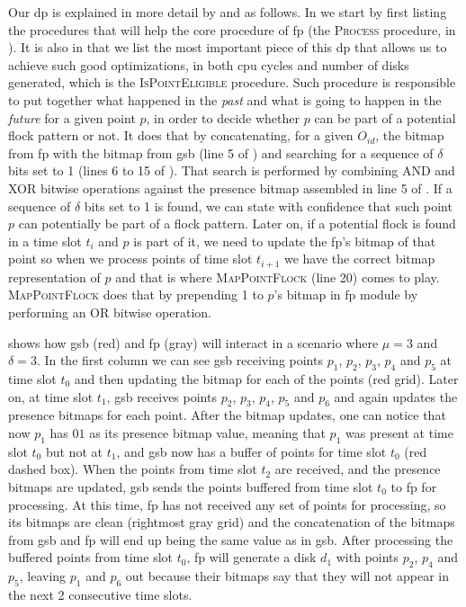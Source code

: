 Our \ac{dp} is explained in more detail by  and  as follows. In
 we start by first listing the procedures that will help the core procedure of \ac{fp} (the
\textsc{Process} procedure, in ). It is also in  that we list the most important
piece of this \ac{dp} that allows us to achieve such good optimizations, in both \ac{cpu} cycles and number of disks
generated, which is the \textsc{IsPointEligible} procedure. Such procedure is responsible to put together what happened
in the \textit{past} and what is going to happen in the \textit{future} for a given point $p$, in order to decide
whether $p$ can be part of a potential flock pattern or not. It does that by concatenating, for a given $O_{id}$, the
bitmap from \ac{fp} with the bitmap from \ac{gsb} (line 5 of ) and searching for a sequence of
$\delta$ bits set to 1 (lines 6 to 15 of ). That search is performed by combining AND and XOR
bitwise operations against the presence bitmap assembled in line 5 of . If a sequence of
$\delta$ bits set to 1 is found, we can state with confidence that such point $p$ can potentially be part of a flock
pattern. Later on, if a potential flock is found in a time slot $t_i$ and $p$ is part of it, we need to update the
\ac{fp}'s bitmap of that point so when we process points of time slot $t_{i+1}$ we have the correct bitmap
representation of $p$ and that is where \textsc{MapPointFlock} (line 20) comes to play. \textsc{MapPointFlock} does
that by prepending 1 to $p$'s bitmap in \ac{fp} module by performing an OR bitwise operation.

 shows how \ac{gsb} (red) and \ac{fp} (gray) will interact in a scenario where $\mu = 3$ and
$\delta = 3$. In the first column we can see \ac{gsb} receiving points $p_1$, $p_2$, $p_3$, $p_4$ and $p_5$ at time slot
$t_0$ and then updating the bitmap for each of the points (red grid). Later on, at time slot $t_1$, \ac{gsb} receives
points $p_2$, $p_3$, $p_4$, $p_5$ and $p_6$ and again updates the presence bitmaps for each point. After the bitmap
updates, one can notice that now $p_1$ has $01$ as its presence bitmap value, meaning that $p_1$ was present at time
slot $t_0$ but not at $t_1$, and \ac{gsb} now has a buffer of points for time slot $t_0$ (red dashed box). When the
points from time slot $t_2$ are received, and the presence bitmaps are updated, \ac{gsb} sends the points buffered from
time slot $t_0$ to \ac{fp} for processing. At this time, \ac{fp} has not received any set of points for processing, so
its bitmaps are clean (rightmost gray grid) and the concatenation of the bitmaps from \ac{gsb} and \ac{fp} will end up
being the same value as in \ac{gsb}. After processing the buffered points from time slot $t_0$, \ac{fp} will generate a
disk $d_1$ with points $p_2$, $p_4$ and $p_5$, leaving $p_1$ and $p_6$ out because their bitmaps say that they will not
appear in the next 2 consecutive time slots.

